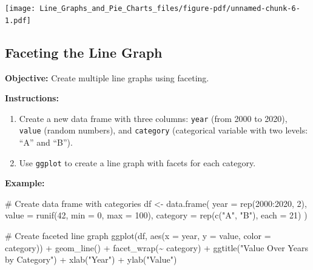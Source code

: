 \documentclass[
  letterpaper,
  DIV=11,
  numbers=noendperiod]{scrreprt}
\newenvironment{Shaded}{\begin{snugshade}}{\end{snugshade}}
\newcommand{\AttributeTok}[1]{\textcolor[rgb]{0.40,0.45,0.13}{#1}}
\newcommand{\CommentTok}[1]{\textcolor[rgb]{0.37,0.37,0.37}{#1}}
\newcommand{\DecValTok}[1]{\textcolor[rgb]{0.68,0.00,0.00}{#1}}
\newcommand{\FunctionTok}[1]{\textcolor[rgb]{0.28,0.35,0.67}{#1}}
\newcommand{\NormalTok}[1]{\textcolor[rgb]{0.00,0.23,0.31}{#1}}
\newcommand{\OtherTok}[1]{\textcolor[rgb]{0.00,0.23,0.31}{#1}}
\newcommand{\SpecialCharTok}[1]{\textcolor[rgb]{0.37,0.37,0.37}{#1}}
\newcommand{\StringTok}[1]{\textcolor[rgb]{0.13,0.47,0.30}{#1}}
\providecommand{\tightlist}{%
  \setlength{\itemsep}{0pt}\setlength{\parskip}{0pt}}\usepackage{longtable,booktabs,array}
\begin{document}
\texttt{[image: Line\_Graphs\_and\_Pie\_Charts\_files/figure-pdf/unnamed-chunk-6-1.pdf]}

\subsection*{Faceting the Line Graph}\label{faceting-the-line-graph}

\textbf{Objective:} Create multiple line graphs using faceting.

\textbf{Instructions:}

\begin{enumerate}
\def\labelenumi{\arabic{enumi}.}
\tightlist
\item
  Create a new data frame with three columns: \texttt{year} (from 2000
  to 2020), \texttt{value} (random numbers), and \texttt{category}
  (categorical variable with two levels: ``A'' and ``B'').
\item
  Use \texttt{ggplot} to create a line graph with facets for each
  category.
\end{enumerate}

\textbf{Example:}

\begin{Shaded}
\begin{Highlighting}[]
\CommentTok{\# Create data frame with categories}
\NormalTok{df }\OtherTok{\textless{}{-}} \FunctionTok{data.frame}\NormalTok{(}
  \AttributeTok{year =} \FunctionTok{rep}\NormalTok{(}\DecValTok{2000}\SpecialCharTok{:}\DecValTok{2020}\NormalTok{, }\DecValTok{2}\NormalTok{),}
  \AttributeTok{value =} \FunctionTok{runif}\NormalTok{(}\DecValTok{42}\NormalTok{, }\AttributeTok{min =} \DecValTok{0}\NormalTok{, }\AttributeTok{max =} \DecValTok{100}\NormalTok{),}
  \AttributeTok{category =} \FunctionTok{rep}\NormalTok{(}\FunctionTok{c}\NormalTok{(}\StringTok{"A"}\NormalTok{, }\StringTok{"B"}\NormalTok{), }\AttributeTok{each =} \DecValTok{21}\NormalTok{)}
\NormalTok{)}

\CommentTok{\# Create faceted line graph}
\FunctionTok{ggplot}\NormalTok{(df, }\FunctionTok{aes}\NormalTok{(}\AttributeTok{x =}\NormalTok{ year, }\AttributeTok{y =}\NormalTok{ value, }\AttributeTok{color =}\NormalTok{ category)) }\SpecialCharTok{+}
  \FunctionTok{geom\_line}\NormalTok{() }\SpecialCharTok{+}
  \FunctionTok{facet\_wrap}\NormalTok{(}\SpecialCharTok{\textasciitilde{}}\NormalTok{ category) }\SpecialCharTok{+}
  \FunctionTok{ggtitle}\NormalTok{(}\StringTok{"Value Over Years by Category"}\NormalTok{) }\SpecialCharTok{+}
  \FunctionTok{xlab}\NormalTok{(}\StringTok{"Year"}\NormalTok{) }\SpecialCharTok{+}
  \FunctionTok{ylab}\NormalTok{(}\StringTok{"Value"}\NormalTok{)}
\end{Highlighting}
\end{Shaded}
\end{document}
